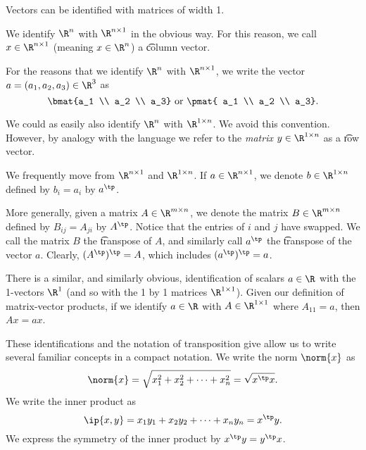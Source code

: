 
Vectors can be identified with matrices of width 1.

We identify $\R^{n}$ with $\R^{n \times 1}$ in the obvious way.
For this reason, we call $x \in \R^{n \times 1}$ (meaning $x \in \R^{n}$) a \t{column vector}.

For the reasons that we identify $\R^n$ with $\R^{n \times 1}$, we write the vector $a = (a_1, a_2, a_3) \in \R^3$ as
  \[
\bmat{a_1 \\ a_2 \\ a_3}
\text{ or }
\pmat{ a_1 \\ a_2 \\ a_3}.
  \]

We could as easily also identify $\R^{n}$ with $\R^{1 \times n}$.
We avoid this convention.
However, by analogy with the language  we refer to the \textit{matrix} $y \in \R^{1 \times n}$ as a \t{row vector}.

We frequently move from $\R^{n \times 1}$ and $\R^{1 \times n}$.
If $a \in \R^{n \times 1}$, we denote $b \in \R^{1 \times n}$ defined by $b_i = a_i$ by $a^\tp$.

More generally, given a matrix $A \in \R^{m \times n}$, we denote the matrix $B \in \R^{m \times n}$ defined by $B_{ij} = A_{ji}$ by $A^\tp$.
Notice that the entries of $i$ and $j$ have swapped.
We call the matrix $B$ the \t{transpose} of $A$, and similarly call $a^\tp$ the \t{transpose} of the vector $a$.
Clearly, $(A^\tp)^\tp = A$, which includes $(a^\tp)^\tp = a$.

There is a similar, and similarly obvious, identification of scalars $a \in \R$ with the 1-vectors $\R^{1}$ (and so with the 1 by 1 matrices $\R^{1 \times 1}$).
Given our definition of matrix-vector products, if we identify $a \in \R$ with $A \in \R^{1 \times 1}$ where $A_{11} = a$, then $Ax = ax$.

These identifications and the notation of transposition give allow us to write several familiar concepts in a compact notation.
We write the norm $\norm{x}$ as
  \[
\norm{x} = \sqrt{x_1^2 + x_2^2 + \cdots + x_n^2} = \sqrt{x^\tp x}.
  \]
We write the inner product as
  \[
\ip{x,y} =
x_1y_1 + x_2y_2 + \cdots + x_ny_n
= x^\tp y.
  \]
We express the symmetry of the inner product by $ x^\tp y = y^\tp x$.

\blankpage
